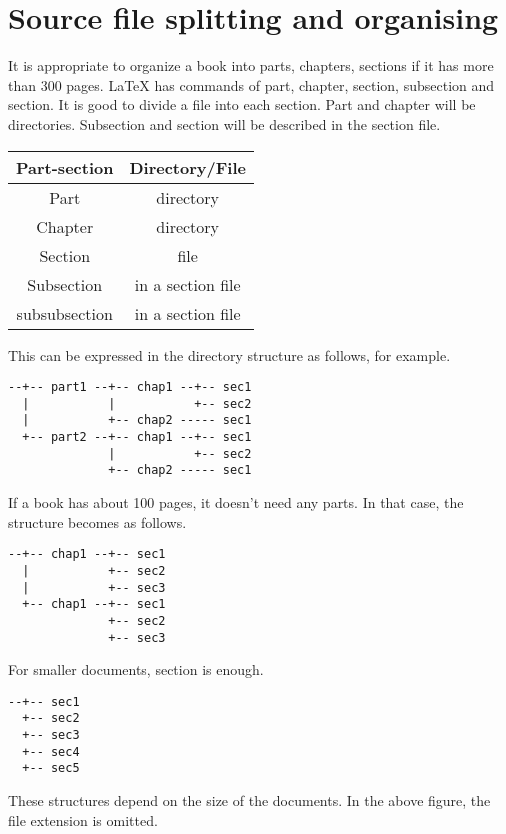 \section{Source file splitting and organising}

It is appropriate to organize a book into parts, chapters, sections if
it has more than 300 pages. LaTeX has commands of part, chapter,
section, subsection and section. It is good to divide a file into
each section. Part and chapter will be directories. Subsection and
section will be described in the section file.

\begin{center}
\begin{tabular}{cc}
  \hline
  Part-section & Directory/File \\
  \hline
  Part & directory \\
  Chapter & directory \\
  Section & file \\
  Subsection & in a section file \\
  subsubsection & in a section file \\
  \hline
\end{tabular}
\end{center}

This can be expressed in the directory structure as follows, for
example.

\begin{verbatim}
--+-- part1 --+-- chap1 --+-- sec1
  |           |           +-- sec2
  |           +-- chap2 ----- sec1
  +-- part2 --+-- chap1 --+-- sec1
              |           +-- sec2
              +-- chap2 ----- sec1
\end{verbatim}

If a book has about 100 pages, it doesn't need any parts. In that case,
the structure becomes as follows.

\begin{verbatim}
--+-- chap1 --+-- sec1
  |           +-- sec2
  |           +-- sec3
  +-- chap1 --+-- sec1
              +-- sec2
              +-- sec3
\end{verbatim}

For smaller documents, section is enough.

\begin{verbatim}
--+-- sec1
  +-- sec2
  +-- sec3
  +-- sec4
  +-- sec5
\end{verbatim}

These structures depend on the size of the documents. In the above
figure, the file extension is omitted.

